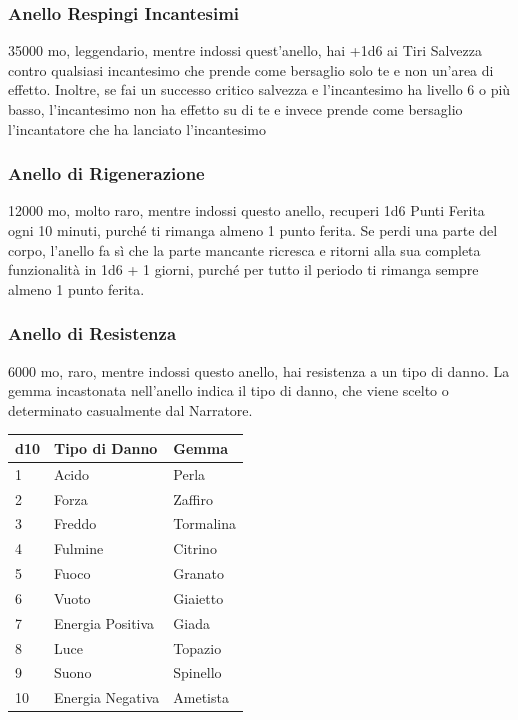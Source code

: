 \begin{multicols}{2}
\subsubsection*{Anello Respingi Incantesimi}
35000 mo, leggendario, mentre indossi quest'anello, hai +1d6 ai Tiri Salvezza contro qualsiasi incantesimo che prende come bersaglio solo te e non un'area di effetto. Inoltre, se fai un successo critico salvezza e l'incantesimo ha livello 6 o più basso, l'incantesimo non ha effetto su di te e invece prende come bersaglio l'incantatore che ha lanciato l'incantesimo

\subsubsection*{Anello di Rigenerazione}
12000 mo, molto raro, mentre indossi questo anello, recuperi 1d6 Punti Ferita ogni 10 minuti, purché ti rimanga almeno 1 punto ferita. Se perdi una parte del corpo, l'anello fa sì che la parte mancante ricresca e ritorni alla sua completa funzionalità in 1d6 + 1 giorni, purché per tutto il periodo ti rimanga sempre almeno 1 punto ferita.

\subsubsection*{Anello di Resistenza}
6000 mo, raro, mentre indossi questo anello, hai resistenza a un tipo di danno. La gemma incastonata nell'anello indica il tipo di danno, che viene scelto o determinato casualmente dal Narratore.

\medskip

\begin{tabular}{lll}
\textbf{d10} & \textbf{Tipo di Danno} & \textbf{Gemma}\\

\hline
1 &Acido &Perla\\
2& Forza &Zaffiro\\
3& Freddo &Tormalina\\
4& Fulmine &Citrino\\
5& Fuoco &Granato\\
6& Vuoto& Giaietto\\
7& Energia Positiva &Giada\\
8& Luce &Topazio\\
9& Suono &Spinello\\
10& Energia Negativa &Ametista\\
\end{tabular}


\end{multicols}
